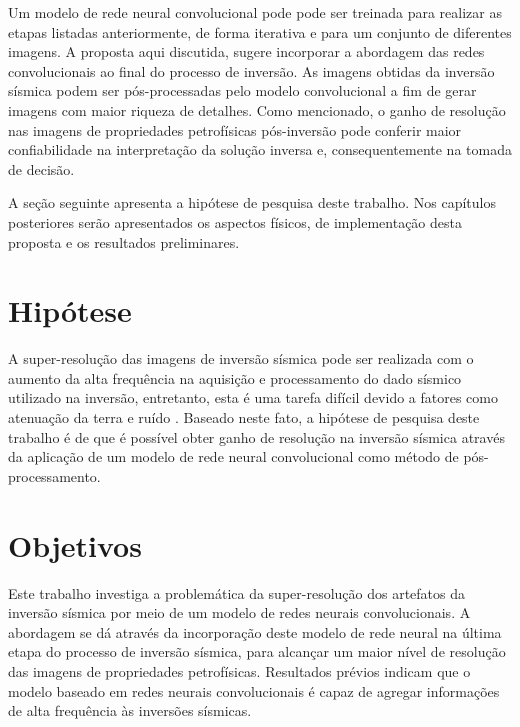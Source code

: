 Um modelo de rede neural convolucional pode pode ser treinada para realizar as etapas listadas anteriormente,
de forma iterativa e para um conjunto de diferentes imagens.
A proposta aqui discutida, sugere incorporar a abordagem das redes convolucionais ao final do processo de inversão.
As imagens obtidas da inversão sísmica podem ser pós-processadas pelo modelo convolucional
a fim de gerar imagens com maior riqueza de detalhes. Como mencionado, o ganho de resolução
nas imagens de propriedades petrofísicas pós-inversão pode conferir maior confiabilidade
na interpretação da solução inversa e, consequentemente na tomada de decisão.

A seção seguinte apresenta a hipótese de pesquisa deste trabalho. Nos capítulos posteriores
serão apresentados os aspectos físicos, de implementação desta proposta e os resultados preliminares.

\section{Hipótese}
A super-resolução das imagens de inversão sísmica pode ser realizada com o aumento da alta frequência na aquisição e
processamento do dado sísmico utilizado na inversão, entretanto, esta é uma tarefa difícil
devido a fatores como atenuação da terra e ruído \citep{Xiaoyu2012}.
Baseado neste fato, a hipótese de pesquisa deste trabalho é de que é possível obter ganho de resolução
na inversão sísmica através da aplicação de um modelo de rede neural convolucional como método de pós-processamento.

\section{Objetivos}

Este trabalho investiga a problemática da super-resolução dos artefatos da inversão sísmica
por meio de um modelo de redes neurais convolucionais.
A abordagem se dá através da incorporação deste modelo de rede neural na última
etapa do processo de inversão sísmica, para alcançar um maior nível de
resolução das imagens de propriedades petrofísicas.
Resultados prévios indicam que o modelo baseado em redes neurais convolucionais é capaz
de agregar informações de alta frequência às inversões sísmicas.

